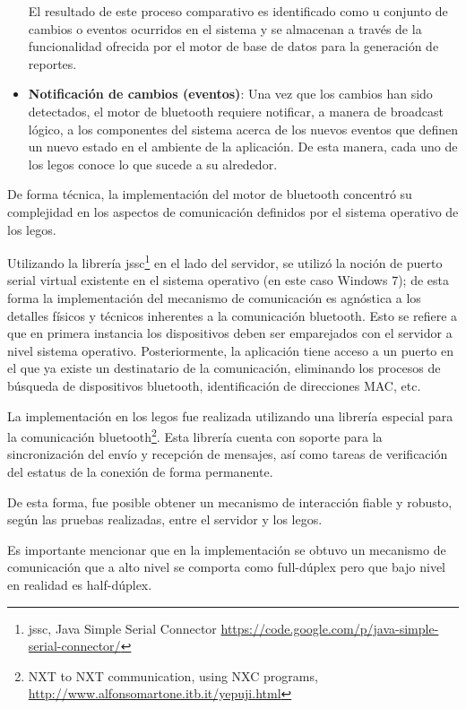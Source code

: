 \documentclass[12pt]{article}
\begin{document}
\begin{itemize}
	El resultado de este proceso comparativo es identificado como u conjunto de cambios o eventos ocurridos en el sistema y se almacenan a través de la funcionalidad ofrecida por el motor de base de datos para la generación de reportes.

	\item \textbf{Notificación de cambios (eventos)}: Una vez que los cambios han sido detectados, el motor de bluetooth requiere notificar, a manera de broadcast lógico, a los componentes del sistema acerca de los nuevos eventos que definen un nuevo estado en el ambiente de la aplicación.
	De esta manera, cada uno de los legos conoce lo que sucede a su alrededor.

\end{itemize}


De forma técnica, la implementación del motor de bluetooth concentró su complejidad en los aspectos de comunicación definidos por el sistema operativo de los legos.

Utilizando la librería jssc\footnote{jssc, Java Simple Serial Connector \url{https://code.google.com/p/java-simple-serial-connector/}} en el lado del servidor, se utilizó la noción de puerto serial virtual existente en el sistema operativo (en este caso Windows 7); de esta forma la implementación del mecanismo de comunicación es agnóstica a los detalles físicos y técnicos inherentes a la comunicación bluetooth.
Esto se refiere a que en primera instancia los dispositivos deben ser emparejados con el servidor a nivel sistema operativo.
Posteriormente, la aplicación tiene acceso a un puerto en el que ya existe un destinatario de la comunicación, eliminando los procesos de búsqueda de dispositivos bluetooth, identificación de direcciones MAC, etc.


La implementación en los legos fue realizada utilizando una librería especial para la comunicación bluetooth\footnote{NXT to NXT communication, using NXC programs, \url{http://www.alfonsomartone.itb.it/yepuji.html}}. 
Esta librería cuenta con soporte para la sincronización del envío y recepción de mensajes, así como tareas de verificación del estatus de la conexión de forma permanente.

De esta forma, fue posible obtener un mecanismo de interacción fiable y robusto, según las pruebas realizadas, entre el servidor y los legos.

Es importante mencionar que en la implementación se obtuvo un mecanismo de comunicación que a alto nivel se comporta como full-dúplex pero que bajo nivel en realidad es half-dúplex.
\end{document}
